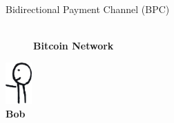 \documentclass[]{beamer}
\begin{document}
\begin{frame}{Bidirectional Payment Channel (BPC)}
\begin{minipage}{0.8\linewidth}
\begin{figure}
			\centering
			\resizebox{3cm}{!}{
				\begin{tikzpicture}[scale=1, every node/.style={scale=1}]
					
			\end{tikzpicture}}\\
			\textbf{Bitcoin Network}
		\end{figure}
		\vspace{-2.9cm}	
	\end{minipage}%
\begin{minipage}{0.1\linewidth}
	\vspace{1.2cm}
	\centering
		\includegraphics[width=1cm]{../assets/images/agents/handing_left}
		\\ \hspace{0.3cm}\textbf{Bob}
		\vspace{-0.5cm}
		\begin{figure}
		\hspace{-1.7cm}
		\resizebox{2.5cm}{!}{
				\begin{tikzpicture}[scale=0.7, every node/.style={scale=0.7}]
					
				\end{tikzpicture}}
		\end{figure}
	
\end{minipage}



\end{frame}
\end{document}
